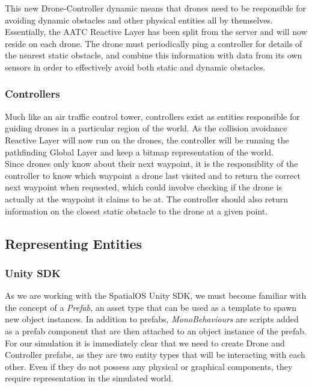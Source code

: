 \documentclass[a4paper,12pt,titlepage]{article}
\begin{document}
This new Drone-Controller dynamic means that drones need to be responsible for avoiding dynamic obstacles and other physical entities all by themselves. Essentially, the AATC Reactive Layer has been split from the server and will now reside on each drone. The drone must periodically ping a controller for details of the nearest static obstacle, and combine this information with data from its own sensors in order to effectively avoid both static and dynamic obstacles.

\subsubsection{Controllers}
Much like an air traffic control tower, controllers exist as entities responsible for guiding drones in a particular region of the world. As the collision avoidance Reactive Layer will now run on the drones, the controller will be running the pathfinding Global Layer and keep a bitmap representation of the world.\\

Since drones only know about their next waypoint, it is the responsiblity of the controller to know which waypoint a drone last visited and to return the correct next waypoint when requested, which could involve checking if the drone is actually at the waypoint it claims to be at. The controller should also return information on the closest static obstacle to the drone at a given point.

\subsection{Representing Entities}
\subsubsection{Unity SDK}
As we are working with the SpatialOS Unity SDK, we must become familiar with the concept of a \textit{Prefab}, an asset type that can be used as a template to spawn new object instances. In addition to prefabs, \textit{MonoBehaviours} are scripts added as a prefab component that are then attached to an object instance of the prefab.\\

For our simulation it is immediately clear that we need to create Drone and Controller prefabs, as they are two entity types that will be interacting with each other. Even if they do not possess any physical or graphical components, they require representation in the simulated world.\\
\end{document}
